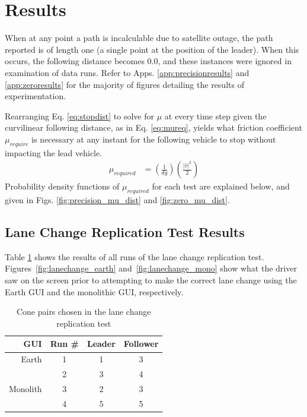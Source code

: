 \section{Results} \label{sec:results}

When at any point a path is incalculable due to satellite outage, the path reported is of length one (a single point at the position of the leader). When this occurs, the following distance becomes 0.0, and these instances were ignored in examination of data runs. Refer to Apps. \ref{app:precisionresults} and \ref{app:zeroresults} for the majority of figures detailing the results of experimentation.

Rearranging Eq. \eqref{eq:stopdist} to solve for $\mu$ at every time step given the curvilinear following distance, as in Eq. \eqref{eq:mureq}, yields what friction coefficient $\mu_{require}$ is necessary at any instant for the following vehicle to stop without impacting the lead vehicle.
\begin{align} \label{eq:mureq}
    \mu_{required} &= \left( \frac {1} {d g} \right) \left(\frac {|\bar{v}|^2} {2} \right)
\end{align}
Probability density functions of $\mu_{required}$ for each test are explained below, and given in Figs. \ref{fig:precision_mu_dist} and \ref{fig:zero_mu_dist}.


\subsection{Lane Change Replication Test Results} \label{sec:lanechangetestresults}

Table \ref{tab:lanechangeresults} shows the results of all runs of the lane change replication test. Figures~\ref{fig:lanechange_earth} and~\ref{fig:lanechange_mono} show what the driver saw on the screen prior to attempting to make the correct lane change using the Earth GUI and the monolithic GUI, respectively.

\begin{table}[htbp] \centering \caption{Cone pairs chosen in the lane change replication test}
\begin{tabular}{rc|cc} 
    GUI&    Run \#  &     Leader&    Follower \\ \hline\hline
    Earth&      1       &       1   &    3 \\
         &      2       &       3   &    4   \\ \hline
    Monolith&   3       &       2   &    3   \\
         &      4       &       5   &    5 \\ \hline   
\end{tabular} \label{tab:lanechangeresults} \end{table}

